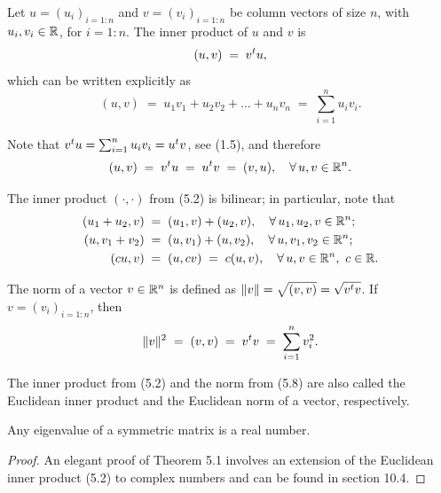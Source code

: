 \begin{definition}
Let $u = (u_i)_{i=1:n}$ and $v = (v_i)_{i=1:n}$ be column vectors of size $n$, with
$u_i, v_i \in \mathbb{R}$, for $i = 1:n$. The inner product of $u$ and $v$ is
\begin{equation}
(u,v) \;=\; v^{t} u,
\end{equation}
which can be written explicitly as
\begin{equation}
(u,v) \;=\; u_1v_1 + u_2v_2 + \dots + u_nv_n \;=\; \sum_{i=1}^{n} u_iv_i.
\end{equation}
\end{definition}

Note that $v^{t} u = \sum_{i=1}^{n} u_iv_i = u^{t} v$, see (1.5), and therefore
\begin{equation}
(u,v) \;=\; v^{t} u \;=\; u^{t} v \;=\; (v,u), \quad \forall\, u,v \in \mathbb{R}^n.
\end{equation}

The inner product $(\cdot,\cdot)$ from (5.2) is bilinear; in particular, note that
\begin{align}
(u_1+u_2,v) &\;=\; (u_1,v)+(u_2,v), \quad \forall\, u_1,u_2,v \in \mathbb{R}^n;\\
(u,v_1+v_2) &\;=\; (u,v_1)+(u,v_2), \quad \forall\, u,v_1,v_2 \in \mathbb{R}^n;\\
(cu,v) &\;=\; (u,cv) \;=\; c(u,v), \quad \forall\, u,v \in \mathbb{R}^n,\ c \in \mathbb{R}.
\end{align}

\begin{definition}
The norm of a vector $v \in \mathbb{R}^n$ is defined as $\|v\| = \sqrt{(v,v)} = \sqrt{v^{t} v}$.
If $v = (v_i)_{i=1:n}$, then
\begin{equation}
\|v\|^2 \;=\; (v,v) \;=\; v^{t} v \;=\; \sum_{i=1}^{n} v_i^2.
\end{equation}
\end{definition}

The inner product from (5.2) and the norm from (5.8) are also called the Euclidean
inner product and the Euclidean norm of a vector, respectively.

\begin{theorem}
Any eigenvalue of a symmetric matrix is a real number.
\end{theorem}

\begin{proof}
An elegant proof of Theorem 5.1 involves an extension of the Euclidean inner product
(5.2) to complex numbers and can be found in section 10.4.
\end{proof}

